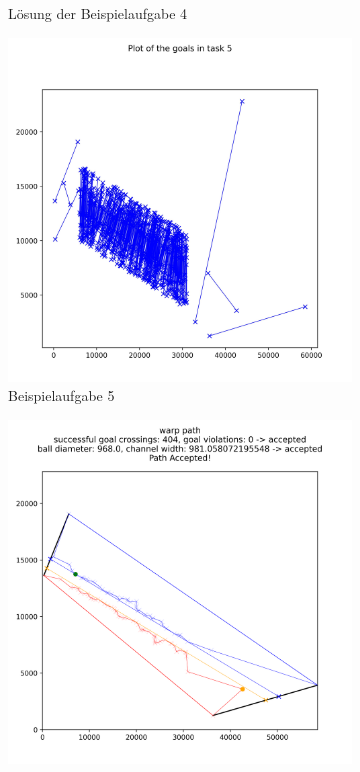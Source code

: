 \begin{figure}
\begin{subfigure}[b]{0.49\textwidth}
         \caption{Lösung der Beispielaufgabe 4}
         \label{fig:five over x}
     \end{subfigure}
          \hfill
     \begin{subfigure}[b]{0.49\textwidth}
         \centering
         \includegraphics[width=\textwidth]{images/task_5.jpeg}
         \caption{Beispielaufgabe 5}
         \label{fig:five over x}
     \end{subfigure}
     \hfill
     \begin{subfigure}[b]{0.49\textwidth}
         \centering
         \includegraphics[width=\textwidth]{images/solution_task_5.png}

\end{subfigure}
\end{figure}
